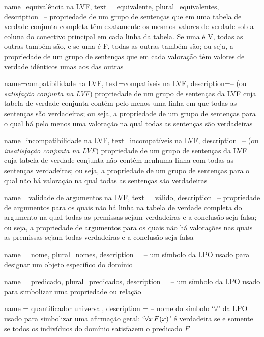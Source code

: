 {
 name=equivalência na LVF,
 text = equivalente,
 plural=equivalentes,
 description={-- propriedade de um grupo de sentenças que em uma tabela de verdade conjunta completa têm exatamente os mesmos valores de verdade sob a coluna do conectivo principal em cada linha da tabela. Se uma é V, todas as outras também são, e se uma é F, todas as outras também são; ou seja, a propriedade de um grupo de sentenças que em cada valoração têm valores de verdade idênticos umas aos das outras}
}

{
 name=compatibilidade na LVF,
 text=compatíveis na LVF,
 description={-- (ou \textit{satisfação conjunta na LVF}) propriedade de um grupo de sentenças da LVF cuja tabela de verdade conjunta contém pelo menos uma linha em que todas as sentenças são verdadeiras; ou seja, a propriedade de um grupo de sentenças para o qual há pelo menos uma valoração na qual todas as sentenças são verdadeiras}
}

{
 name=incompatibilidade na LVF,
 text=incompatíveis na LVF,
 description={-- (ou \textit{insatisfação conjunta na LVF}) propriedade de um grupo de sentenças da LVF cuja tabela de verdade conjunta não contém nenhuma linha com todas as sentenças verdadeiras; ou seja, a propriedade de um grupo de sentenças para o qual não há valoração na qual todas as sentenças são verdadeiras}
}

{
 name= validade de argumentos na LVF,
 text = válido,
 description={-- propriedade de argumentos para os quais não há linha na tabela de verdade completa do argumento na qual todas as premissas sejam verdadeiras e a conclusão seja falsa; ou seja, a propriedade de argumentos para os quais não há valorações nas quais as premissas sejam todas verdadeiras e a conclusão seja falsa}
}

{
 name = nome,
 plural=nomes,
 description = {-- um símbolo da LPO usado para designar um objeto específico do domínio}
}

{
 name = predicado,
 plural=predicados,
 description = {-- um símbolo da LPO usado para simbolizar uma propriedade ou relação}
}

{
 name = quantificador universal,
 description = {-- nome do símbolo `$\forall$' da LPO usado para simbolizar uma afirmação geral: `$\forall x\, \mathord{F}(x)$' é verdadeira se e somente se todos os indivíduos do domínio satisfazem o predicado $F$}
}

